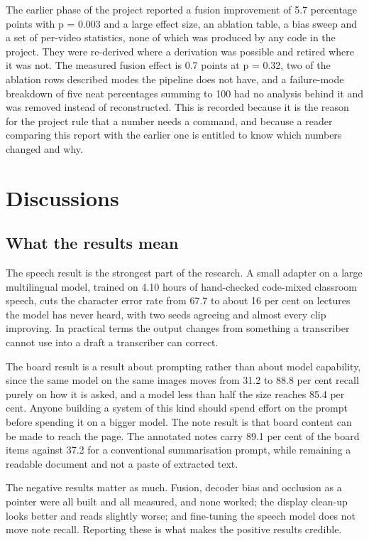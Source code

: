 The earlier phase of the project reported a fusion improvement of 5.7 percentage points
with p = 0.003 and a large effect size, an ablation table, a bias sweep and a set of
per-video statistics, none of which was produced by any code in the project. They were
re-derived where a derivation was possible and retired where it was not. The measured
fusion effect is 0.7 points at p = 0.32, two of the ablation rows described modes the
pipeline does not have, and a failure-mode breakdown of five neat percentages summing to
100 had no analysis behind it and was removed instead of reconstructed. This is recorded
because it is the reason for the project rule that a number needs a command, and because a
reader comparing this report with the earlier one is entitled to know which numbers
changed and why.

\section{Discussions}

\subsection{What the results mean}

The speech result is the strongest part of the research. A small adapter on a large
multilingual model, trained on 4.10 hours of hand-checked code-mixed classroom speech,
cuts the character error rate from 67.7 to about 16 per cent on lectures the model has
never heard, with two seeds agreeing and almost every clip improving. In practical terms
the output changes from something a transcriber cannot use into a draft a transcriber can
correct.

The board result is a result about prompting rather than about model capability, since the
same model on the same images moves from 31.2 to 88.8 per cent recall purely on how it is
asked, and a model less than half the size reaches 85.4 per cent. Anyone building a system
of this kind should spend effort on the prompt before spending it on a bigger model. The
note result is that board content can be made to reach the page. The annotated notes carry
89.1 per cent of the board items against 37.2 for a conventional summarisation prompt,
while remaining a readable document and not a paste of extracted text.

The negative results matter as much. Fusion, decoder bias and occlusion as a pointer were
all built and all measured, and none worked; the display clean-up looks better and reads
slightly worse; and fine-tuning the speech model does not move note recall. Reporting
these is what makes the positive results credible.

